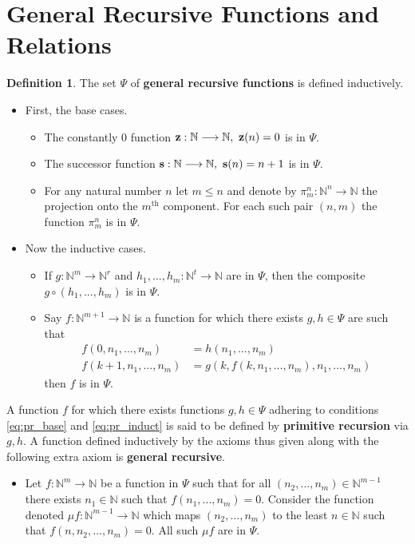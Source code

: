 \documentclass[12pt]{article}
\theoremstyle{plain}
\theoremstyle{definition}
\newtheorem{defn}[thm]{Definition} %
\newcommand{\bb}[1]{\mathbb{#1}}
\newcommand{\lto}{\longrightarrow}
\begin{document}
	\section{General Recursive Functions and Relations}\label{sec:prim_rec}
	\begin{defn}\label{def:primitive_recursive}
		The set $\Psi$ of \textbf{general recursive functions} is defined inductively.
		\begin{itemize}
			\item First, the base cases.
			\begin{itemize}
				\item The constantly $0$ function $\bold{z}: \bb{N} \lto \bb{N},\text{ }\bold{z}(n) = 0$ is in $\Psi$.
				\item The successor function $\bold{s}: \bb{N} \lto \bb{N},\text{ }\bold{s}(n) = n+1$ is in $\Psi$.
				\item For any natural number $n$ let $m \leq n$ and denote by $\pi_m^n: \bb{N}^n \lto \bb{N}$ the projection onto the $m^\text{th}$ component. For each such pair $(n,m)$ the function $\pi^n_m$ is in $\Psi$.
			\end{itemize}
			\item Now the inductive cases.
			\begin{itemize}
				\item If $g: \bb{N}^m \lto \bb{N}^r$ and $h_1,...,h_m: \bb{N}^t \lto \bb{N}$ are in $\Psi$, then the composite $g \circ (h_1,...,h_m)$ is in $\Psi$.
				\item Say $f: \bb{N}^{m+1} \lto \bb{N}$ is a function for which there exists $g,h \in \Psi$ are such that
				\begin{align}
					f(0,n_1,...,n_m) &= h(n_1,...,n_m)\label{eq:pr_base}\\
					f(k+1,n_1,...,n_m) &= g(k, f(k, n_1,...,n_m),n_1,...,n_m)\label{eq:pr_induct}
				\end{align}
				then $f$ is in $\Psi$.
			\end{itemize}
		\end{itemize}
		A function $f$ for which there exists functions $g,h \in \Psi$ adhering to conditions \eqref{eq:pr_base} and \eqref{eq:pr_induct} is said to be defined by \textbf{primitive recursion} via $g,h$. A function defined inductively by the axioms thus given along with the following extra axiom is \textbf{general recursive}.
		\begin{itemize}
			\item Let $f: \bb{N}^m \lto \bb{N}$ be a function in $\Psi$ such that for all $(n_2,...,n_m) \in \bb{N}^{m-1}$ there exists $n_1 \in \bb{N}$ such that $f(n_1,...,n_m) = 0$. Consider the function denoted $\mu f: \bb{N}^{m-1} \lto \bb{N}$ which maps $(n_2,...,n_m)$ to the least $n \in \bb{N}$ such that $f(n,n_2,...,n_m) = 0$. All such $\mu f$ are in $\Psi$.
		\end{itemize}
		

\end{defn}
\end{document}
